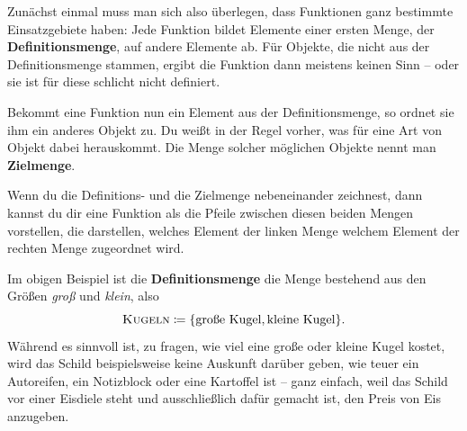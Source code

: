 \documentclass[../../main.tex]{subfiles}
\begin{document}
\parpic[r]{
}
Zunächst einmal muss man sich also überlegen, dass Funktionen ganz bestimmte Einsatzgebiete haben: Jede Funktion bildet Elemente einer ersten Menge, der \textbf{Definitionsmenge}, auf andere Elemente ab. Für Objekte, die nicht aus der Definitionsmenge stammen, ergibt die Funktion dann meistens keinen Sinn -- oder sie ist für diese schlicht nicht definiert.

Bekommt eine Funktion nun ein Element aus der Definitionsmenge, so ordnet sie ihm ein anderes Objekt zu. Du weißt in der Regel vorher, was für eine Art von Objekt dabei herauskommt. Die Menge solcher möglichen Objekte nennt man \textbf{Zielmenge}.

Wenn du die Definitions- und die Zielmenge nebeneinander zeichnest, dann kannst du dir eine Funktion als die Pfeile zwischen diesen beiden Mengen vorstellen, die darstellen, welches Element der linken Menge welchem Element der rechten Menge zugeordnet wird.

\begin{example}{}
    Im obigen Beispiel ist die \textbf{Definitionsmenge} die Menge bestehend aus den Größen \emph{groß} und \emph{klein}, also 
    \[\textsc{Kugeln}\coloneqq\{\text{große Kugel},\text{kleine Kugel}\}.\]
    Während es sinnvoll ist, zu fragen, wie viel eine große oder kleine Kugel kostet, wird das Schild beispielsweise keine Auskunft darüber geben, wie teuer ein Autoreifen, ein Notizblock oder eine Kartoffel ist -- ganz einfach, weil das Schild vor einer Eisdiele steht und ausschließlich dafür gemacht ist, den Preis von Eis anzugeben.
\end{example}
\end{document}
